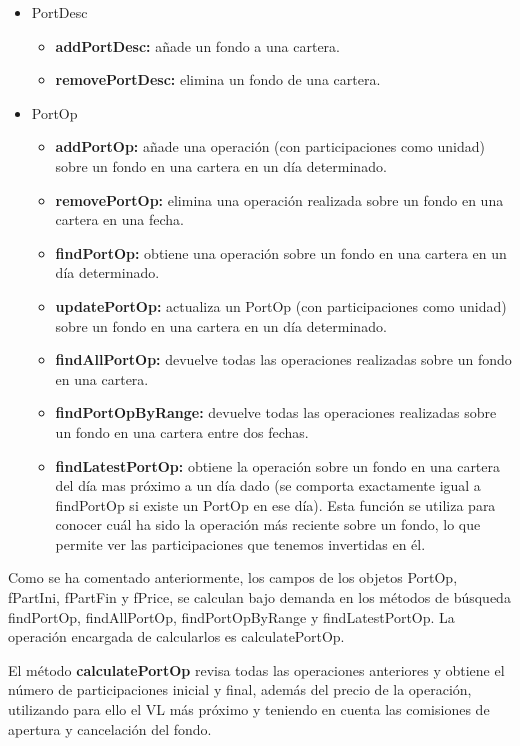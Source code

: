 \documentclass[12pt, a4paper]{book}
\begin{document}
\begin{itemize}
	\item PortDesc
						\begin{itemize}
							\item\textbf{addPortDesc:} añade un fondo a una cartera.
							\item\textbf{removePortDesc:} elimina un fondo de una cartera.
						\end{itemize}
	\item PortOp
						\begin{itemize}
							\item\textbf{addPortOp:} añade una operación (con participaciones como unidad) sobre un fondo en una cartera en un día determinado.
							\item\textbf{removePortOp:} elimina una operación realizada sobre un fondo en una cartera en una fecha.
							\item \textbf{findPortOp:} obtiene una operación sobre un fondo en una cartera en un día determinado.
							\item \textbf{updatePortOp:} actualiza un PortOp (con participaciones como unidad) sobre un fondo en una cartera en un día determinado.
							\item \textbf{findAllPortOp:} devuelve todas las operaciones realizadas sobre un fondo en una cartera.
							\item \textbf{findPortOpByRange:} devuelve todas las operaciones realizadas sobre un fondo en una cartera entre dos fechas.
							\item \textbf{findLatestPortOp:} obtiene la operación sobre un fondo en una cartera del día mas próximo a un día dado (se comporta exactamente igual a findPortOp si existe un PortOp en ese día). Esta función se utiliza para conocer cuál ha sido la operación más reciente sobre un fondo, lo que permite ver las participaciones que tenemos invertidas en él.\\
						\end{itemize}
	
\end{itemize}

Como se ha comentado anteriormente, los campos de los objetos PortOp, fPartIni, fPartFin y fPrice, se calculan bajo demanda en los métodos de búsqueda findPortOp, findAllPortOp, findPortOpByRange y findLatestPortOp. La operación encargada de calcularlos es calculatePortOp.\\

\newpage

El método \textbf{calculatePortOp} revisa todas las operaciones anteriores y obtiene el número de participaciones inicial y final, además del precio de la operación, utilizando para ello el \gls{VL} más próximo y teniendo en cuenta las comisiones de apertura y cancelación del fondo.\\
\end{document}
